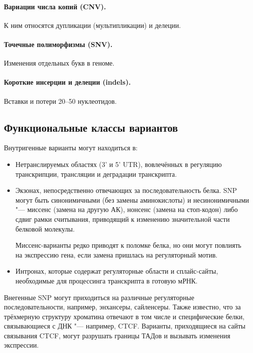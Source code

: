 \documentclass[a4paper,12pt]{article}
\begin{document}
\paragraph{Вариации числа копий (CNV).}
К ним относятся дупликации (мультипликации) и делеции.

\paragraph{Точечные полиморфизмы (SNV).}
Изменения отдельных букв в геноме.

\paragraph{Короткие инсерции и делеции (indels).}
Вставки и потери 20--50 нуклеотидов.

\subsection{Функциональные классы вариантов}

Внутригенные варианты могут находиться в:

\begin{itemize}
\item Нетранслируемых областях (3' и 5' UTR), вовлечённых в регуляцию транскрипции, трансляции и деградации транскрипта.
\item Экзонах, непосредственно отвечающих за последовательность белка.
SNP могут быть синонимичными (без замены аминокислоты) и несинонимичными "--- миссенс (замена на другую АК), нонсенс (замена на стоп-кодон) либо сдвиг рамки считывания, приводящий к изменению значительной части белковой молекулы.

Миссенс-варианты редко приводят к поломке белка, но они могут повлиять на экспрессию гена, если замена пришлась на регуляторный мотив\cite{brea-fernandez}.

\item Интронах, которые содержат регуляторные области и сплайс-сайты, необходимые для процессинга транскрипта в готовую мРНК.
\end{itemize}

Внегенные SNP могут приходиться на различные регуляторные последовательности, например, энхансеры, сайленсеры.
Также известно, что за трёхмерную структуру хроматина отвечают в том числе и специфические белки, связывающиеся с ДНК "--- например, CTCF\cite{wutz}.
Варианты, приходящиеся на сайты связывания CTCF, могут разрушать границы ТАДов и вызывать изменения экспрессии.
\end{document}
